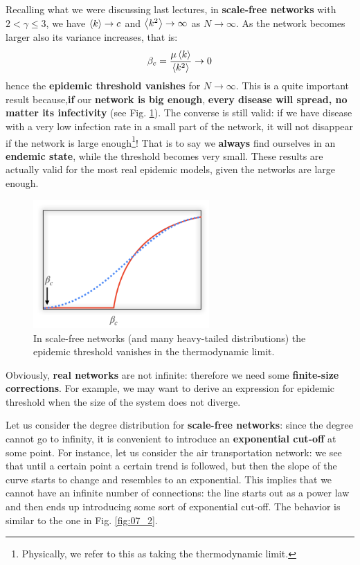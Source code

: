 \documentclass[../main/main.tex]{subfiles}
\begin{document}
Recalling what we were discussing last lectures, in \textbf{scale-free networks} with \( 2 < \gamma \le 3  \), we have \( \expval{k} \rightarrow c  \) and \( \expval{k^2}  \rightarrow \infty  \) as \( N \rightarrow \infty  \).
As the network becomes larger also its variance increases, that is:
\begin{equation*}
  \beta _c = \frac{\mu \expval{k} }{\expval{k^2} } \rightarrow 0
\end{equation*}
hence the \textbf{epidemic threshold vanishes} for \( N \rightarrow \infty  \).
This is a quite important result because,\textbf{if} our \textbf{network is big enough}, \textbf{every disease will spread, no matter its infectivity} (see Fig. \ref{fig:07_1}). The converse is still valid: if we have disease with a very low infection rate in a small part of the network, it will not disappear if the network is large enough\footnote{Physically, we refer to this as taking the thermodynamic limit.}! That is to say we \textbf{always} find ourselves in an \textbf{endemic state}, while the threshold becomes very small. These results are actually valid for the most real epidemic models, given the networks are large enough.

\begin{figure}[h!]
\centering
\includegraphics[width=0.6\textwidth]{../lessons/image/07/1.png}
\caption{\label{fig:07_1} In scale-free networks (and many heavy-tailed distributions) the epidemic threshold vanishes in the thermodynamic limit.}
\end{figure}

Obviously, \textbf{real networks} are not infinite: therefore we need some \textbf{finite-size corrections}. For example, we may want to derive an expression for epidemic threshold when the size of the system does not diverge.

Let us consider the degree distribution for \textbf{scale-free networks}: since the degree cannot go to infinity, it is convenient to introduce an \textbf{exponential cut-off} at some point. For instance, let us consider the air transportation network: we see that until a certain point a certain trend is followed, but then the slope of the curve starts to change and resembles to an exponential. This implies that we cannot have an infinite number of connections: the line starts out as a power law and then ends up introducing some sort of exponential cut-off. The behavior is similar to the one in Fig. \ref{fig:07_2}.
\end{document}
